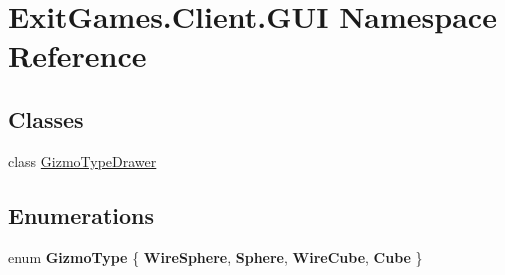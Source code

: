 \hypertarget{namespace_exit_games_1_1_client_1_1_g_u_i}{}\section{Exit\+Games.\+Client.\+G\+UI Namespace Reference}
\label{namespace_exit_games_1_1_client_1_1_g_u_i}
\subsection*{Classes}
\begin{DoxyCompactItemize}
\item 
class \hyperlink{class_exit_games_1_1_client_1_1_g_u_i_1_1_gizmo_type_drawer}{Gizmo\+Type\+Drawer}
\end{DoxyCompactItemize}
\subsection*{Enumerations}
\begin{DoxyCompactItemize}
\item 
enum {\bfseries Gizmo\+Type} \{ {\bfseries Wire\+Sphere}, 
{\bfseries Sphere}, 
{\bfseries Wire\+Cube}, 
{\bfseries Cube}
 \}\hypertarget{namespace_exit_games_1_1_client_1_1_g_u_i_a818c6c37f51ee72cef59e460e7295d65}{}\label{namespace_exit_games_1_1_client_1_1_g_u_i_a818c6c37f51ee72cef59e460e7295d65}

\end{DoxyCompactItemize}
